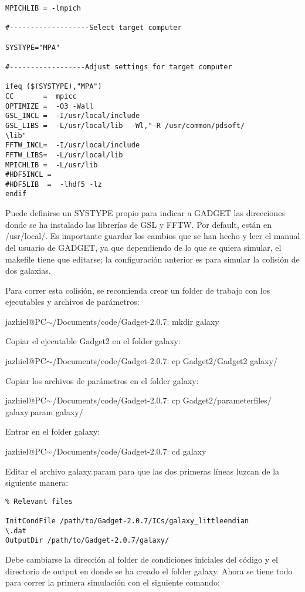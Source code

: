 \documentclass[a4paper,openright,12pt]{book}
\begin{document}
\begin{enumerate}
\begin{verbatim}
MPICHLIB = -lmpich

#-------------------Select target computer

SYSTYPE="MPA"

#------------------Adjust settings for target computer

ifeq ($(SYSTYPE),"MPA")
CC       =  mpicc   
OPTIMIZE =  -O3 -Wall
GSL_INCL =  -I/usr/local/include
GSL_LIBS =  -L/usr/local/lib  -Wl,"-R /usr/common/pdsoft/
\lib"
FFTW_INCL=  -I/usr/local/include
FFTW_LIBS=  -L/usr/local/lib
MPICHLIB =  -L/usr/lib
#HDF5INCL =  
#HDF5LIB  =  -lhdf5 -lz 
endif
\end{verbatim}
Puede definirse un \textsf{SYSTYPE} propio para indicar a GADGET las direcciones donde se ha instalado las librerías de GSL y FFTW. Por default, están en \textsf{/usr/local/}. Es importante guardar los cambios que se han hecho y leer el manual del usuario de GADGET, ya que dependiendo de lo que se quiera simular, el \textsf{makefile} tiene que editarse; la configuración anterior es para simular la colisión de dos galaxias.

Para correr esta colisión, se recomienda crear un folder de trabajo con los ejecutables y archivos de parámetros:

\textsf{jazhiel@PC$\sim$/Documents/code/Gadget-2.0.7: mkdir galaxy}

Copiar el ejecutable \textsf{Gadget2} en el folder \textsf{galaxy}:

\textsf{jazhiel@PC$\sim$/Documents/code/Gadget-2.0.7: cp Gadget2/Gadget2 galaxy/}

Copiar los archivos de parámetros en el folder \textsf{galaxy}:

\textsf{jazhiel@PC$\sim$/Documents/code/Gadget-2.0.7: cp Gadget2/parameterfiles/
galaxy.param galaxy/}

Entrar en el folder \textsf{galaxy}:

\textsf{jazhiel@PC$\sim$/Documents/code/Gadget-2.0.7: cd galaxy}

Editar el archivo \textsf{galaxy.param} para que las dos primeras líneas luzcan de la siguiente manera:

\begin{verbatim}
% Relevant files

InitCondFile /path/to/Gadget-2.0.7/ICs/galaxy_littleendian
\.dat
OutputDir /path/to/Gadget-2.0.7/galaxy/
\end{verbatim}

Debe cambiarse la dirección al folder de condiciones iniciales del código y el directorio de \textsf{output} en donde se ha creado el folder \textsf{galaxy}. Ahora se tiene todo para correr la primera simulación con el siguiente comando:


\end{enumerate}
\end{document}
